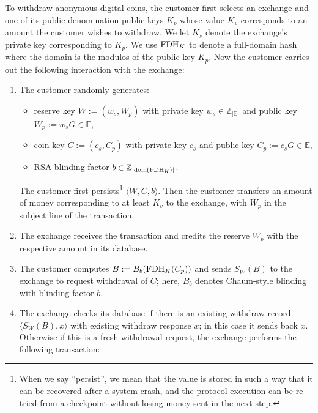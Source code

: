 \documentclass[sigconf, authordraft]{acmart}
\newcommand\inecc{\in \mathbb{Z}_{|\mathbb{E}|}}
\newcommand\inept{\in {\mathbb{E}}}
\newcommand\inrsa{\in \mathbb{Z}_{|\mathrm{dom}(\FDH_K)|}}
\begin{document}
To withdraw anonymous digital coins, the customer first selects an
exchange and one of its public denomination public keys $K_p$ whose
value $K_v$ corresponds to an amount the customer wishes to withdraw.
We let $K_s$ denote the exchange's private key corresponding to $K_p$.
We use $\textrm{FDH}_K$ to denote a full-domain hash where the domain is the
modulos of the public key $K_p$.  Now the customer carries out the
following interaction with the exchange:


\begin{enumerate}
  \item The customer randomly generates:
    \begin{itemize}
      \item reserve key $W := (w_s,W_p)$ with private key $w_s \inecc$ and public key $W_p := w_sG \inept$,
      \item coin key $C := (c_s,C_p)$ with private key $c_s$ and public key $C_p := c_s G \inept$,
      \item RSA blinding factor $b \inrsa$.
    \end{itemize}
    The customer first persists\footnote{When we say ``persist'', we mean that the value
    is stored in such a way that it can be recovered after a system crash, and
    the protocol execution can be re-tried from a checkpoint
    without losing money sent in the next step.} $\langle W, C, b \rangle$.
    Then the customer transfers an amount of money corresponding to
    at least $K_v$ to the exchange, with $W_p$ in the subject line
    of the transaction.
  \item
    The exchange receives the transaction and credits the reserve $W_p$
    with the respective amount in its database.
  \item
    The customer computes $B := B_b(\textrm{FDH}_K(C_p))$ and sends $S_W(B)$ to
    the exchange to request withdrawal of $C$; here, $B_b$ denotes
    Chaum-style blinding with blinding factor $b$.
  \item
    The exchange checks its database if there is an existing withdraw record $\langle S_W(B), x \rangle$
    with existing withdraw response $x$; in this case it sends back $x$.\\
    Otherwise if this is a fresh withdrawal request, the exchange performs the following transaction:

\end{enumerate}
\end{document}
